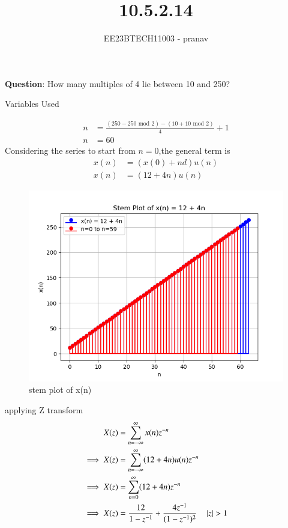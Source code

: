 \documentclass[journal,12pt,twocolumn]{IEEEtran}
\theoremstyle{remark}
\begin{document}

\vspace{3cm}

\title{10.5.2.14}
\author{EE23BTECH11003 - pranav}
\maketitle
\newpage

\bigskip
\renewcommand{\thefigure}{\arabic{figure}}
\renewcommand{\thetable}{\arabic{table}}

\textbf{Question}:
How many multiples of 4 lie between 10 and 250?\\
\solution
\fi
\begin{table}[h]
    \centering
    
    \caption{Variables Used}
    \label{tab:10.5.2.14}
\end{table}
\begin{align}
    n&=\frac{(250-250 \text{ mod } 2)-(10+10\text{ mod } 2)}{4}+1\\
    n&=60
\end{align}
Considering the series to start from $n=0$,the general term is
\begin{align}
x(n)&=(x(0)+nd)u(n)\\
x(n)&=(12+4n)u(n)
\end{align}
\begin{figure}[h!]
    \centering
    \includegraphics[width=\linewidth]{ncert-maths/10/5/2/14/figs/graph1.png}
    \caption{stem plot of x(n)}
\end{figure}
applying Z transform
\begin{align}
    X(z)&= \sum_{n=-\infty}^{\infty}x(n) z^{-n}\\
   \implies X(z)&= \sum_{n=-\infty}^{\infty} (12+4n) u(n) z^{-n}\\
   \implies X(z) &=\sum_{n= 0}^{\infty} (12+4n)  z^{-n}\\
   \implies X(z)&=\frac{12}{1-z^{-1}}+\frac{4 z^{-1}}{(1-z^{-1})^{2}}\quad \left\vert z\right\vert>1
\end{align}
\end{document}
